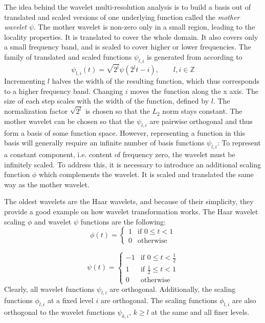       The idea behind the wavelet multi-resolution analysis is to build a basis out of translated and scaled versions of one underlying function called the \textit{mother wavelet} $\psi$. The mother wavelet is non-zero only in a small region, leading to the locality properties. It is translated to cover the whole domain. It also covers only a small frequency band, and is scaled to cover higher or lower frequencies. The family of translated and scaled functions $\psi_{l,i}$ is generated from   according to
      \begin{equation}
        \psi_{l,i}(t) = \sqrt{2^l} \psi \left(2^l t-i\right), \qquad l, i \in \mathbb{Z}
      \end{equation}
      Incrementing $l$ halves the width of the resulting function, which thus corresponds to a higher frequency band. Changing $i$ moves the function along the x axis. The size of each step scales with the width of the function, defined by $l$. The normalization factor $\sqrt{2^l}$ is chosen so that the $L_2$ norm stays constant. The mother wavelet can be chosen so that the $\psi_{l,i}$ are pairwise orthogonal and thus form a basis of some function space. However, representing a function in this basis will generally require an infinite number of basis functions $\psi_{l,i}$: To represent a constant component, i.e. content of frequency zero, the wavelet must be infinitely scaled. To address this, it is necessary to introduce an additional scaling function $\phi$ which complements the wavelet. It is scaled and translated the same way as the mother wavelet.

      The oldest wavelets are the Haar wavelets, and because of their simplicity, they provide a good example on how wavelet transformation works. The Haar wavelet scaling $\phi$ and wavelet $\psi$ functions are the following:
      \begin{equation}
        \phi(t) = 
        \begin{cases}
          1 & \text{if } 0 \leq t < 1 \\
          0 & \text{otherwise}
        \end{cases}
        \label{eq:scaling}
      \end{equation}

      \begin{equation}
        \psi(t) = 
        \begin{cases}
          -1 & \text{if } 0 \leq t < \frac{1}{2} \\
          1 & \text{if } \frac{1}{2} \leq t < 1 \\
          0 & \text{otherwise}
        \end{cases}
        \label{eq:wavelet}
      \end{equation}
      Clearly, all wavelet functions $\psi_{l,i}$ are orthogonal. Additionally, the scaling functions $\phi_{l,i}$ at a fixed level $i$ are orthogonal. The scaling functions $\phi_{l,i}$ are also orthogonal to the wavelet functions $\psi_{k,i}$, $k \geq l$ at the same and all finer levels.

